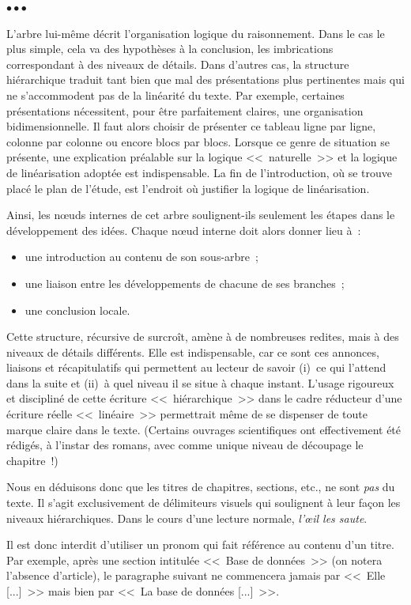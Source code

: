 \documentclass[11pt, french, screen, research-development]{report-rd-info}
\newenvironment{explanation}
{\color{blue}
 \begin{list}{}{\hspace{0.2\textwidth}\color{blue}}\item $\bullet\bullet\bullet$
}
{\end{list}}
\begin{document}
\begin{explanation}
   L'arbre lui-même décrit l'organisation logique du raisonnement.
   Dans le cas le plus simple, cela va des hypothèses à la conclusion, les imbrications correspondant à des niveaux de détails.
   Dans d'autres cas, la structure hiérarchique traduit tant bien que mal des présentations plus pertinentes mais qui ne s'accommodent pas de la linéarité du texte.
   Par exemple, certaines présentations nécessitent, pour être parfaitement claires, une organisation bidimensionnelle.
   Il faut alors choisir de présenter ce tableau ligne par ligne, colonne par colonne ou encore blocs par blocs.
   Lorsque ce genre de situation se présente, une explication préalable sur la logique <<~naturelle~>> et la logique de linéarisation adoptée est indispensable.
   La fin de l'introduction, où se trouve placé le plan de l'étude, est l'endroit où justifier la logique de linéarisation.

   Ainsi, les n\oe uds internes de cet arbre soulignent-ils seulement les étapes dans le développement des idées.
   Chaque n\oe ud interne doit alors donner lieu à~:
   \begin{itemize}
      \item une introduction au contenu de son sous-arbre~;
      \item une liaison entre les développements de chacune de ses branches~;
      \item une conclusion locale.
   \end{itemize}
   Cette structure, récursive de surcroît, amène à de nombreuses redites, mais à des niveaux de détails différents.
   Elle est indispensable, car ce sont ces annonces, liaisons et récapitulatifs qui permettent au lecteur de savoir (i)~ce qui l'attend dans la suite et (ii)~à quel niveau il se situe à chaque instant.
   L'usage rigoureux et discipliné de cette écriture <<~hiérarchique~>> dans le cadre réducteur d'une écriture réelle <<~linéaire~>> permettrait même de se dispenser de toute marque claire dans le texte.
   (Certains ouvrages scientifiques ont effectivement été rédigés, à l'instar des romans, avec comme unique niveau de découpage le chapitre~!)

   Nous en déduisons donc que les titres de chapitres, sections, etc., ne sont \emph{pas} du texte.
   Il s'agit exclusivement de délimiteurs visuels qui soulignent à leur façon les niveaux hiérarchiques.
   Dans le cours d'une lecture normale, \emph{l'\oe il les saute}.

   Il est donc interdit d'utiliser un pronom qui fait référence au contenu d'un titre.
   Par exemple, après une section intitulée <<~Base de données~>> (on notera l'absence d'article), le paragraphe suivant ne commencera jamais par <<~Elle [...]~>> mais bien par <<~La base de données [...]~>>.


\end{explanation}
\end{document}
